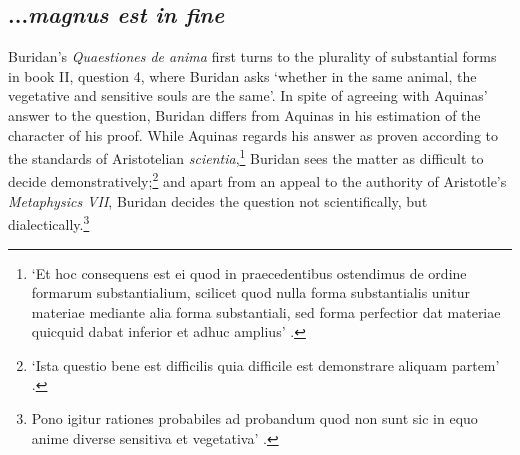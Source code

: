 \documentclass[]{article}
\begin{document}
\subsection{...\textit{magnus est in fine}}
Buridan's \textit{Quaestiones de anima} first turns to the plurality of substantial forms in book II, question 4, where Buridan asks `whether in the same animal, the vegetative and sensitive souls are the same'.\autocite[II.4.1]{BuridanQDA}  In spite of agreeing with Aquinas' answer to the question, Buridan differs from Aquinas in his estimation of the character of his proof. While Aquinas regards his answer as proven according to the standards of Aristotelian \textit{scientia},\footnote{`Et hoc consequens est ei quod in praecedentibus ostendimus de ordine formarum substantialium, scilicet quod nulla forma substantialis unitur materiae mediante alia forma substantiali, sed forma perfectior dat materiae quicquid dabat inferior et adhuc amplius' \autocite[q. 1, art. 11, co.]{AquinasDA}.}  Buridan sees the matter as difficult to decide demonstratively;\footnote{`Ista questio bene est difficilis quia difficile est demonstrare aliquam partem' \autocite[II.4.10]{BuridanQDA}.} and apart from an appeal to the authority of Aristotle's \textit{Metaphysics VII}, Buridan decides the question not scientifically, but dialectically.\footnote{Pono igitur rationes probabiles ad probandum quod non sunt sic in equo anime diverse sensitiva et vegetativa' \autocite[II.4.15]{BuridanQDA}.}
\end{document}
